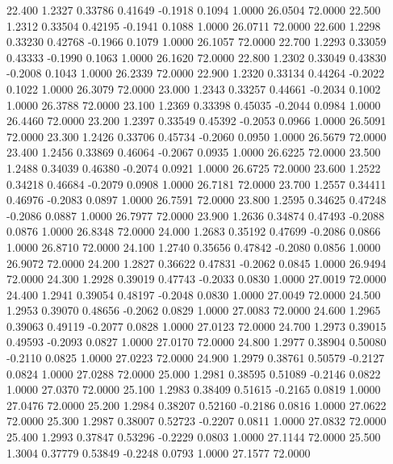   22.400   1.2327   0.33786   0.41649  -0.1918   0.1094   1.0000  26.0504  72.0000
  22.500   1.2312   0.33504   0.42195  -0.1941   0.1088   1.0000  26.0711  72.0000
  22.600   1.2298   0.33230   0.42768  -0.1966   0.1079   1.0000  26.1057  72.0000
  22.700   1.2293   0.33059   0.43333  -0.1990   0.1063   1.0000  26.1620  72.0000
  22.800   1.2302   0.33049   0.43830  -0.2008   0.1043   1.0000  26.2339  72.0000
  22.900   1.2320   0.33134   0.44264  -0.2022   0.1022   1.0000  26.3079  72.0000
  23.000   1.2343   0.33257   0.44661  -0.2034   0.1002   1.0000  26.3788  72.0000
  23.100   1.2369   0.33398   0.45035  -0.2044   0.0984   1.0000  26.4460  72.0000
  23.200   1.2397   0.33549   0.45392  -0.2053   0.0966   1.0000  26.5091  72.0000
  23.300   1.2426   0.33706   0.45734  -0.2060   0.0950   1.0000  26.5679  72.0000
  23.400   1.2456   0.33869   0.46064  -0.2067   0.0935   1.0000  26.6225  72.0000
  23.500   1.2488   0.34039   0.46380  -0.2074   0.0921   1.0000  26.6725  72.0000
  23.600   1.2522   0.34218   0.46684  -0.2079   0.0908   1.0000  26.7181  72.0000
  23.700   1.2557   0.34411   0.46976  -0.2083   0.0897   1.0000  26.7591  72.0000
  23.800   1.2595   0.34625   0.47248  -0.2086   0.0887   1.0000  26.7977  72.0000
  23.900   1.2636   0.34874   0.47493  -0.2088   0.0876   1.0000  26.8348  72.0000
  24.000   1.2683   0.35192   0.47699  -0.2086   0.0866   1.0000  26.8710  72.0000
  24.100   1.2740   0.35656   0.47842  -0.2080   0.0856   1.0000  26.9072  72.0000
  24.200   1.2827   0.36622   0.47831  -0.2062   0.0845   1.0000  26.9494  72.0000
  24.300   1.2928   0.39019   0.47743  -0.2033   0.0830   1.0000  27.0019  72.0000
  24.400   1.2941   0.39054   0.48197  -0.2048   0.0830   1.0000  27.0049  72.0000
  24.500   1.2953   0.39070   0.48656  -0.2062   0.0829   1.0000  27.0083  72.0000
  24.600   1.2965   0.39063   0.49119  -0.2077   0.0828   1.0000  27.0123  72.0000
  24.700   1.2973   0.39015   0.49593  -0.2093   0.0827   1.0000  27.0170  72.0000
  24.800   1.2977   0.38904   0.50080  -0.2110   0.0825   1.0000  27.0223  72.0000
  24.900   1.2979   0.38761   0.50579  -0.2127   0.0824   1.0000  27.0288  72.0000
  25.000   1.2981   0.38595   0.51089  -0.2146   0.0822   1.0000  27.0370  72.0000
  25.100   1.2983   0.38409   0.51615  -0.2165   0.0819   1.0000  27.0476  72.0000
  25.200   1.2984   0.38207   0.52160  -0.2186   0.0816   1.0000  27.0622  72.0000
  25.300   1.2987   0.38007   0.52723  -0.2207   0.0811   1.0000  27.0832  72.0000
  25.400   1.2993   0.37847   0.53296  -0.2229   0.0803   1.0000  27.1144  72.0000
  25.500   1.3004   0.37779   0.53849  -0.2248   0.0793   1.0000  27.1577  72.0000
